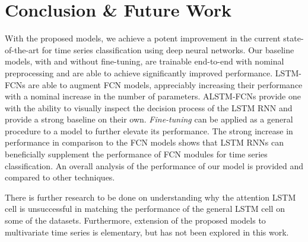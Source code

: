 \documentclass[article]{IEEEtran}
\begin{document}
\section{Conclusion \& Future Work}
\label{conclusion}
With the proposed models, we achieve a potent improvement in the current state-of-the-art for time series classification using deep neural networks. Our baseline models, with and without fine-tuning, are trainable end-to-end with nominal preprocessing and are able to achieve significantly improved performance. LSTM-FCNs are able to augment FCN models, appreciably increasing their performance with a nominal increase in the number of parameters. ALSTM-FCNs provide one with the ability to visually inspect the decision process of the LSTM RNN and provide a strong baseline on their own. \textit{Fine-tuning} can be applied as a general procedure to a model to further elevate its performance. The strong increase in performance in comparison to the FCN models shows that LSTM RNNs can beneficially supplement the performance of FCN modules for time series classification. An overall analysis of the performance of our model is provided and compared to other techniques. 

There is further research to be done on understanding why the attention LSTM cell is unsuccessful in matching the performance of the general LSTM cell on some of the datasets. Furthermore, extension of the proposed models to multivariate time series is elementary, but has not been explored in this work.  


















\ifCLASSOPTIONcaptionsoff
  \newpage
\fi









{}
\end{document}
